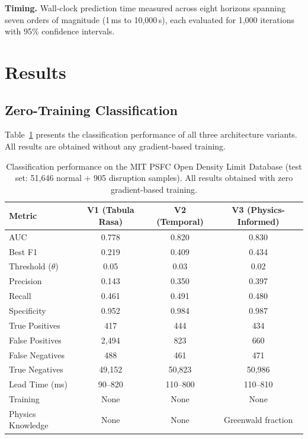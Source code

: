 \documentclass[twocolumn,prl,aps,superscriptaddress,floatfix]{revtex4-2}
\begin{document}
\textbf{Timing.} Wall-clock prediction time measured across eight horizons spanning seven orders of magnitude (1\,ms to 10,000\,s), each evaluated for 1,000 iterations with 95\% confidence intervals.

\section{Results}
\label{sec:results}

\subsection{Zero-Training Classification}

Table~\ref{tab:classification} presents the classification performance of all three architecture variants. All results are obtained without any gradient-based training.

\begin{table}[t]
\caption{\label{tab:classification}Classification performance on the MIT PSFC Open Density Limit Database (test set: 51,646 normal + 905 disruption samples). All results obtained with zero gradient-based training.}
\begin{ruledtabular}
\begin{tabular}{lccc}
Metric & V1 (Tabula Rasa) & V2 (Temporal) & V3 (Physics-Informed) \\
\midrule
AUC & 0.778 & 0.820 & 0.830 \\
Best F1 & 0.219 & 0.409 & 0.434 \\
Threshold ($\theta$) & 0.05 & 0.03 & 0.02 \\
Precision & 0.143 & 0.350 & 0.397 \\
Recall & 0.461 & 0.491 & 0.480 \\
Specificity & 0.952 & 0.984 & 0.987 \\
True Positives & 417 & 444 & 434 \\
False Positives & 2,494 & 823 & 660 \\
False Negatives & 488 & 461 & 471 \\
True Negatives & 49,152 & 50,823 & 50,986 \\
Lead Time (ms) & 90--820 & 110--800 & 110--810 \\
Training & None & None & None \\
Physics Knowledge & None & None & Greenwald fraction \\
\end{tabular}
\end{ruledtabular}
\end{table}
\end{document}
